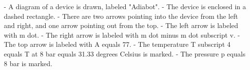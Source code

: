 - A diagram of a device is drawn, labeled "Adiabot".
- The device is enclosed in a dashed rectangle.
- There are two arrows pointing into the device from the left and right, and one arrow pointing out from the top.
- The left arrow is labeled with m dot.
- The right arrow is labeled with m dot minus m dot subscript v.
- The top arrow is labeled with A equals 77.
- The temperature T subscript 4 equals T at 8 bar equals 31.33 degrees Celsius is marked.
- The pressure p equals 8 bar is marked.